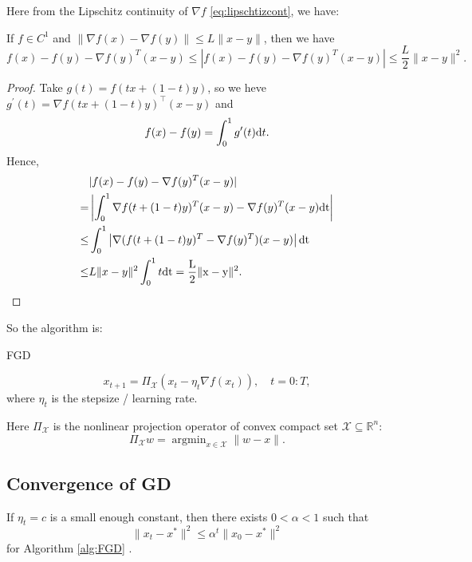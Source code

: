 Here from the Lipschitz continuity of $\nabla f$ \eqref{eq:lipschtizcont}, we have:
\begin{lemma}
If $f \in C^1$ and $\| \nabla f(x) - \nabla f(y)\| \le L \|x- y\|$, then we have
\begin{equation}
f(x) - f(y) - \nabla f(y)^T(x-y) \le |f(x) - f(y) - \nabla f(y)^T(x-y)| \le \frac{L}{2}\|x- y\|^2.
\end{equation} 
\end{lemma}
\begin{proof}
Take $g(t) = f(tx + (1-t)y)$, so we heve $g^\prime(t) = \nabla f(tx + (1-t)y)^\top (x- y)$ and 
\begin{equation*}
f(x) - f(y) = \int_0^1 g^{\prime}(t) {\rm d}t .
\end{equation*}
Hence,
\begin{align*}
&|f(x) - f(y) - \nabla f(y)^T(x-y)| \\
= & \left |\int_0^1 \nabla f(t + (1-t)y)^T(x- y) - \nabla f(y)^T(x-y)\rm{dt}\right | \\
\le & \int_0^1 \left | \nabla (f(t + (1-t)y)^T- \nabla f(y)^T)(x-y)\right | \rm{dt} \\
\le & L\|x - y\|^2 \int_0^1 t \rm{dt} = \frac{L}{2}\|x-y\|^2.
\end{align*}
\end{proof}


So the algorithm is:
\begin{algorithm}
\caption{ FGD} 
\label{alg:FGD}
\begin{equation}\label{equ:fgd-iteration}
x_{t+1} = \Pi_{\mathcal{X}}(x_{t} - \eta_t \nabla f(x_t)), \quad t = 0:T,
\end{equation}
where $\eta_t$ is the stepsize / learning rate.
\end{algorithm}

Here $\Pi_{\mathcal{X}}$ is the nonlinear projection operator of convex compact set $\mathcal{X} \subseteq \mathbb{R}^n$:
\begin{equation}
\Pi_{\mathcal{X}} w = \mathop{\arg\min}_{x \in \mathcal{X}} \|w - x\|.
\end{equation}

\subsection{Convergence of GD}
\begin{theorem}
If $\eta_t  = c $ is a small enough constant, then there exists $ 0< \alpha < 1 $ such that
\begin{equation}
\|x_t - x^*\|^2 \le  \alpha^t \|x_0 - x^*\|^2
\end{equation}
for Algorithm \ref{alg:FGD} .
\end{theorem}

